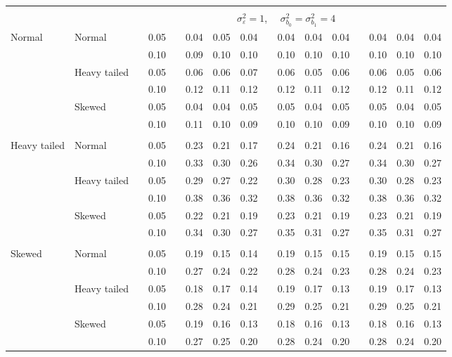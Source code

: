 \documentclass[12pt]{article} %
\begin{document}
\begin{table}[ht]
\begin{scriptsize}
\begin{center}
\begin{tabular}{ll p{.1cm} c p{.1cm} rrr p{.1cm} rrr p{.1cm} rrr}
&&&&&&&&&&&&&&&\\
& && && \multicolumn{9}{c}{$\sigma_{\varepsilon}^2 = 1$, \ \ $\sigma_{b_0}^2 = \sigma_{b_1}^2 = 4$} \\ \cline{6-16}
\rowcolor{gray!20}Normal       & Normal       && 0.05 &&   0.04 & 0.05 & 0.04 && 0.04 & 0.04 & 0.04 && 0.04 & 0.04 & 0.04 \\ 
\rowcolor{gray!20}             &              && 0.10 &&   0.09 & 0.10 & 0.10 && 0.10 & 0.10 & 0.10 && 0.10 & 0.10 & 0.10 \\ 
\rowcolor{gray!20}             & Heavy tailed && 0.05 &&   0.06 & 0.06 & 0.07 && 0.06 & 0.05 & 0.06 && 0.06 & 0.05 & 0.06 \\ 
\rowcolor{gray!20}             &              && 0.10 &&   0.12 & 0.11 & 0.12 && 0.12 & 0.11 & 0.12 && 0.12 & 0.11 & 0.12 \\ 
\rowcolor{gray!20}             & Skewed       && 0.05 &&   0.04 & 0.04 & 0.05 && 0.05 & 0.04 & 0.05 && 0.05 & 0.04 & 0.05 \\ 
\rowcolor{gray!20}             &              && 0.10 &&   0.11 & 0.10 & 0.09 && 0.10 & 0.10 & 0.09 && 0.10 & 0.10 & 0.09 \\ 
             &&&&&&&&&&&&&&&\\
Heavy tailed & Normal       && 0.05 &&   0.23 & 0.21 & 0.17 && 0.24 & 0.21 & 0.16 && 0.24 & 0.21 & 0.16 \\ 
             &              && 0.10 &&   0.33 & 0.30 & 0.26 && 0.34 & 0.30 & 0.27 && 0.34 & 0.30 & 0.27 \\ 
             & Heavy tailed && 0.05 &&   0.29 & 0.27 & 0.22 && 0.30 & 0.28 & 0.23 && 0.30 & 0.28 & 0.23 \\ 
             &              && 0.10 &&   0.38 & 0.36 & 0.32 && 0.38 & 0.36 & 0.32 && 0.38 & 0.36 & 0.32 \\ 
             & Skewed       && 0.05 &&   0.22 & 0.21 & 0.19 && 0.23 & 0.21 & 0.19 && 0.23 & 0.21 & 0.19 \\ 
             &              && 0.10 &&   0.34 & 0.30 & 0.27 && 0.35 & 0.31 & 0.27 && 0.35 & 0.31 & 0.27 \\ 
             &&&&&&&&&&&&&&&\\
Skewed       & Normal       && 0.05 &&   0.19 & 0.15 & 0.14 && 0.19 & 0.15 & 0.15 && 0.19 & 0.15 & 0.15 \\ 
             &              && 0.10 &&   0.27 & 0.24 & 0.22 && 0.28 & 0.24 & 0.23 && 0.28 & 0.24 & 0.23 \\ 
             & Heavy tailed && 0.05 &&   0.18 & 0.17 & 0.14 && 0.19 & 0.17 & 0.13 && 0.19 & 0.17 & 0.13 \\ 
             &              && 0.10 &&   0.28 & 0.24 & 0.21 && 0.29 & 0.25 & 0.21 && 0.29 & 0.25 & 0.21 \\ 
             & Skewed       && 0.05 &&   0.19 & 0.16 & 0.13 && 0.18 & 0.16 & 0.13 && 0.18 & 0.16 & 0.13 \\ 
             &              && 0.10 &&   0.27 & 0.25 & 0.20 && 0.28 & 0.24 & 0.20 && 0.28 & 0.24 & 0.20 \\ 



\end{tabular}
\end{center}
\end{scriptsize}
\end{table}
\end{document}

